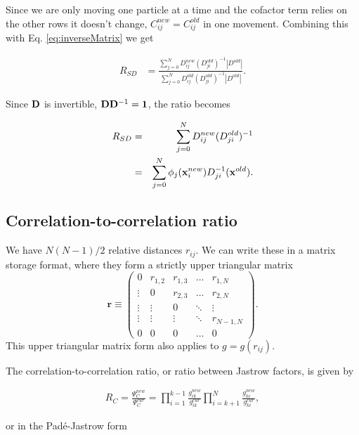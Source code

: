 		Since we are only moving one particle at a time and the cofactor term relies on the other rows it doesn't change, \(C^{new}_{ij} = C^{old}_{ij}\) in one movement. Combining this with Eq. \eqref{eq:inverseMatrix} we get

		\begin{align}
			R_{SD} &=  \frac{\sum_{j=0}^N D_{ij}^{new} (D_{ji}^{old})^{-1} |D^{old}| }{\sum_{j=0}^N D_{ij}^{old} (D_{ji}^{old})^{-1} |D^{old}| }.
		\end{align}

		Since \(\vb{D}\) is invertible, \(\vb{D}\vb{D}^{-1} = \vb{1}\), the ratio becomes

		\begin{eqnarray*}
			R_{SD} & = & \sum_{j = 0}^{N}D_{ij}^{new}(D_{ji}^{old})^{-1}\\
			       & = &\sum_{j = 0}^{N} \phi_j(\vb{x}^{new}_i) D_{ji}^{-1}(\vb{x}^{old}).
		\end{eqnarray*}

	\subsection{Correlation-to-correlation ratio}

		We have $N\left(N-1\right)/2$ relative distances $r_{ij}$. We can
		write these in a matrix storage format, where they form a strictly
		upper triangular matrix
		\[
		\mathbf{r}\equiv\left(\begin{array}{ccccc}
		0 & r_{1,2} & r_{1,3} & \dots & r_{1,N}\\
		\vdots & 0 & r_{2,3} & \dots & r_{2,N}\\
		\vdots & \vdots & 0 & \ddots & \vdots\\
		\vdots & \vdots & \vdots & \ddots & r_{N-1,N}\\
		0 & 0 & 0 & \dots & 0
		\end{array}\right).
		\]
		This upper triangular matrix form also applies to $g=g\left(r_{ij}\right)$.

		The correlation-to-correlation ratio, or ratio between Jastrow factors,
		is given by

		\begin{align}
			R_{C}=\frac{\Psi_{C}^{new}}{\Psi_{C}^{cur}}=\prod_{i=1}^{k-1}\frac{g_{ik}^{new}}{g_{ik}^{cur}}\prod_{i=k+1}^{N}\frac{g_{ki}^{new}}{g_{ki}^{cur}},
		\end{align}

		or in the Padé-Jastrow form

